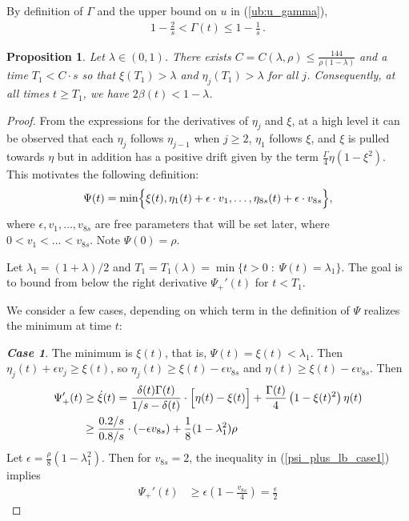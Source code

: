 \documentclass[a4paper,12pt]{article}
\newtheorem{proposition}{Proposition}
\begin{document}
\medskip

By definition of $\Gamma$ and the upper bound on $u$ in (\ref{ub:u_gamma}),
\begin{align} \label{eq:Gamma_lb_ub}
1 - \frac{2}{s} < \Gamma(t) \leq 1 - \frac{1}{s}\,.
\end{align}

\begin{proposition} \label{prop:phase1_progress}
Let $\lambda \in (0, 1)$. There exists $C = C(\lambda, \rho) \leq \frac{144}{\rho (1 - \lambda)}$ and a time $T_{1} < C \cdot s$ so that $\xi(T_{1}) > \lambda$ and $\eta_j(T_{1}) > \lambda$ for all $j$. Consequently, at all times  $t \geq T_{1}$, we have $2 \beta(t) < 1 - \lambda$.
\end{proposition}
\begin{proof}
	From the expressions for the derivatives of $\eta_j$ and $\xi$, at a high level it can be observed that each $\eta_{j}$ follows $\eta_{j-1}$ when $j \geq 2$, $\eta_1$ follows $\xi$, and $\xi$ is pulled towards $\eta$ but in addition has a positive drift given by the term $\frac{\Gamma}{4} \eta (1 - \xi^2)$. This motivates the following definition:
	\begin{align} \label{psi_fun}
	\Psi(t) = \min\Bigl\{ \xi(t), \eta_1(t) + \epsilon \cdot v_1, \ldots, \eta_{8s}(t) + \epsilon \cdot v_{8s} \Bigr\},
	\end{align}
	where $\epsilon, v_1, \ldots, v_{8s}$ are free parameters that will be set later, where $0 < v_1 < \ldots < v_{8s}$. Note $\Psi(0) = \rho$.
	
	Let $\lambda_1 = (1 + \lambda)/2$ and $T_1 = T_1(\lambda) = \min\{t > 0 \; : \; \Psi(t) = \lambda_1\}$. The goal is to bound from below the right derivative $\Psi_{+}'(t)$ for $t < T_{1}$.
	
\medskip
	
	We consider a few cases, depending on which term in the definition of $\Psi$ realizes the minimum at time $t$:
	
	\smallskip
	
	\noindent \textbf{\emph{Case 1}}. The minimum is $\xi(t)$, that is, $\Psi(t) = \xi(t) < \lambda_1$. Then $\eta_j(t) + \epsilon v_j \geq \xi(t)$, so $\eta_j(t) \geq \xi(t) - \epsilon v_{8s}$ and $\eta(t) \geq \xi(t) - \epsilon v_{8s}$. Then
	\begin{align} \label{psi_plus_lb_case1}
	\Psi_{+}'(t) & \geq \dot{\xi}(t) = \frac{\delta(t)\Gamma(t)}{1/s - \delta(t)} \cdot \Bigl[ \eta(t) - \xi(t) \Bigr] + \frac{\Gamma(t)}{4} \left( 1 - \xi(t)^2 \right) \eta(t) \notag \\
	& \geq \frac{0.2/s}{0.8/s} \cdot (-\epsilon v_{8s}) + \frac{1}{8}(1 - \lambda_1^2)\rho
	\end{align}
	Let $\epsilon = \frac{\rho}{8}(1 - \lambda_1^2)$. Then for $v_{8s}=2$, the inequality in (\ref{psi_plus_lb_case1}) implies
	\begin{align}
	\Psi_{+}'(t) & \geq \epsilon \left( 1 - \frac{v_{8s}}{4}\right) = \frac{\epsilon}{2}
	\end{align}
	

\end{proof}
\end{document}
